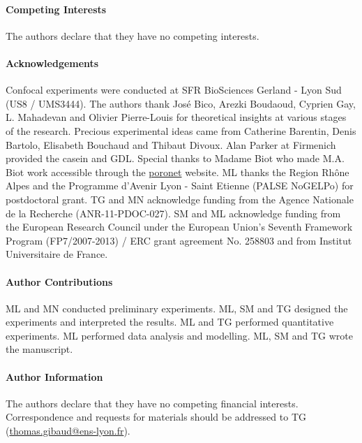 \documentclass[twocolumn,superscriptaddress,showpacs,preprintnumbers, amsmath,amssymb,prl]{revtex4-1}
\begin{document}
\paragraph*{Competing Interests}
The authors declare that they have no competing interests.

\paragraph*{Acknowledgements}
Confocal experiments were conducted at SFR BioSciences Gerland - Lyon Sud (US8 / UMS3444).
The authors thank Jos\'e Bico, Arezki Boudaoud, Cyprien Gay, L. Mahadevan and Olivier Pierre-Louis for theoretical insights at various stages of the research. 
Precious experimental ideas came from Catherine Barentin, Denis Bartolo, Elisabeth Bouchaud and Thibaut Divoux.
Alan Parker at Firmenich provided the casein and GDL. 
Special thanks to Madame Biot who made M.A. Biot work accessible through the \href{http://www.olemiss.edu/sciencenet/poronet/}{poronet} website. 
ML thanks the Region Rh{\^o}ne Alpes and the Programme d'Avenir Lyon - Saint Etienne (PALSE NoGELPo) for postdoctoral grant. 
TG and MN acknowledge funding from the Agence Nationale de la Recherche (ANR-11-PDOC-027). 
SM and ML acknowledge funding from the European Research Council under the European Union's Seventh Framework Program (FP7/2007-2013) / ERC grant agreement No. 258803 and from Institut Universitaire de France.


\paragraph*{Author Contributions}
ML and MN conducted preliminary experiments. ML, SM and TG designed the experiments and interpreted the results. ML and TG performed quantitative experiments. ML performed data analysis and modelling. ML, SM and TG wrote the manuscript.


\paragraph*{Author Information} 
The authors declare that they have no competing financial interests. 
Correspondence and requests for materials should be addressed to TG (\href{mailto:thomas.gibaud@ens-lyon.fr}{thomas.gibaud@ens-lyon.fr}).
\end{document}
